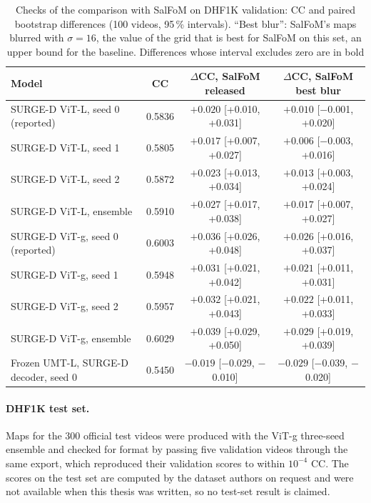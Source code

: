 \begin{table}[htbp]
  \centering
  \caption{Checks of the comparison with SalFoM on DHF1K validation: \acrshort{CC} and
  paired bootstrap differences (100 videos, 95\,\% intervals). \enquote{Best blur}:
  SalFoM's maps blurred with $\sigma=16$, the value of the grid that is best for
  SalFoM on this set, an upper bound for the baseline. Differences whose interval
  excludes zero are in bold}\label{tab:dhf1k-checks}
  \footnotesize
  \setlength{\tabcolsep}{4pt}
  \begin{tabularx}{\textwidth}{@{}>{\raggedright}Xccc@{}}
    \toprule
    \textbf{Model} & \textbf{\acrshort{CC}} & $\Delta$\textbf{\acrshort{CC}}\textbf{, SalFoM released}
      & $\Delta$\textbf{\acrshort{CC}}\textbf{, SalFoM best blur} \\
    \midrule
    SURGE-D \acrshort{ViT}-L, seed 0 (reported) & 0.5836 & $\mathbf{+0.020}$ [+0.010, +0.031] & $+0.010$ [$-$0.001, +0.020] \\
    SURGE-D \acrshort{ViT}-L, seed 1            & 0.5805 & $\mathbf{+0.017}$ [+0.007, +0.027] & $+0.006$ [$-$0.003, +0.016] \\
    SURGE-D \acrshort{ViT}-L, seed 2            & 0.5872 & $\mathbf{+0.023}$ [+0.013, +0.034] & $\mathbf{+0.013}$ [+0.003, +0.024] \\
    SURGE-D \acrshort{ViT}-L, ensemble          & 0.5910 & $\mathbf{+0.027}$ [+0.017, +0.038] & $\mathbf{+0.017}$ [+0.007, +0.027] \\
    SURGE-D \acrshort{ViT}-g, seed 0 (reported) & 0.6003 & $\mathbf{+0.036}$ [+0.026, +0.048] & $\mathbf{+0.026}$ [+0.016, +0.037] \\
    SURGE-D \acrshort{ViT}-g, seed 1            & 0.5948 & $\mathbf{+0.031}$ [+0.021, +0.042] & $\mathbf{+0.021}$ [+0.011, +0.031] \\
    SURGE-D \acrshort{ViT}-g, seed 2            & 0.5957 & $\mathbf{+0.032}$ [+0.021, +0.043] & $\mathbf{+0.022}$ [+0.011, +0.033] \\
    SURGE-D \acrshort{ViT}-g, ensemble          & 0.6029 & $\mathbf{+0.039}$ [+0.029, +0.050] & $\mathbf{+0.029}$ [+0.019, +0.039] \\
    Frozen \acrshort{UMT}-L, SURGE-D decoder, seed 0 & 0.5450 & $\mathbf{-0.019}$ [$-$0.029, $-$0.010] & $\mathbf{-0.029}$ [$-$0.039, $-$0.020] \\
    \bottomrule
  \end{tabularx}
\end{table}

\paragraph{DHF1K test set.} Maps for the 300 official test videos were produced
with the \acrshort{ViT}-g three-seed ensemble and checked for format by passing five
validation videos through the same export, which reproduced their validation
scores to within $10^{-4}$ \acrshort{CC}. The scores on the test set are computed by the
dataset authors on request and were not available when this thesis was
written, so no test-set result is claimed.

